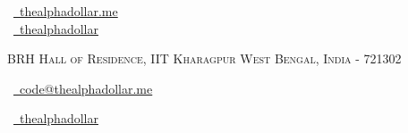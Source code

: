 \documentclass[a4paper,10pt]{extarticle} %
\begin{document}
\pagestyle{empty} %


\begin{multicols}{3}
\normalsize  \faGlobe\ {\href{https://thealphadollar.me/}{\  thealphadollar.me}}\\
\normalsize \faGithub\ {\href{https://github.com/thealphadollar}{\  thealphadollar}}\\
\columnbreak
\normalsize\par{\centering{\huge\textsc{\textcolor{primary}{Shivam Kumar Jha}}}\par} %
\par{\centering\normalsize {\textsc{BRH Hall of Residence, IIT Kharagpur West Bengal, India - 721302}}\hfill\par}
\columnbreak
\raggedright\hfill\normalsize \faEnvelope\ {\href{mailto:code@thealphadollar.me}{\  code@thealphadollar.me}}\\
\raggedright\hfill\normalsize \faLinkedinSquare\ {\href{https://www.linkedin.com/in/thealphadollar}{\  thealphadollar}}\\
\end{multicols}
\vspace{-0.4 cm}

\end{document}
